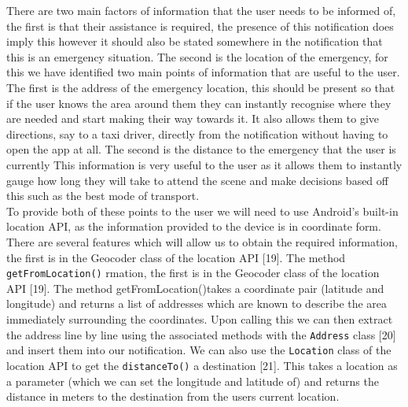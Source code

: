 \documentclass{article}
\begin{document}
There are two main factors of information that the user needs to be informed of, the first is that their assistance is required, the presence of this notification does imply this however it should also be stated somewhere in the notification that this is an emergency situation. The second is the location of the emergency, for this we have identified two main points of information that are useful to the user. The first is the address of the emergency location, this should be present so that if the user knows the area around them they can instantly recognise where they are needed and start making their way towards it. It also allows them to give directions, say to a taxi driver, directly from the notification without having to open the app at all. The second is the distance to the emergency that the user is currently This information is very useful to the user as it allows them to instantly gauge how long they will take to attend the scene and make decisions based off this such as the best mode of transport.\\

To provide both of these points to the user we will need to use Android’s built-in location API, as the information provided to the device is in coordinate form. There are several features which will allow us to obtain the required information, the first is in the Geocoder class of the location API [19]. The method \texttt{\color{OliveGreen}getFromLocation()} rmation, the first is in the Geocoder class of the location API [19]. The method getFromLocation()takes a coordinate pair (latitude and longitude) and returns a list of addresses which are known to describe the area immediately surrounding the coordinates. Upon calling this we can then extract the address line by line using the associated methods with the \texttt{\color{OliveGreen}Address} class [20] and insert them into our notification. We can also use the \texttt{\color{OliveGreen}Location} class of the location API to get the \texttt{\color{OliveGreen}distanceTo()} a destination [21]. This takes a location as a parameter (which we can set the longitude and latitude of) and returns the distance in meters to the destination from the users current location.\\
\end{document}
